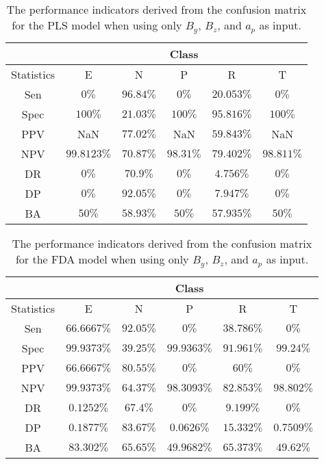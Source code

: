 \begin{table}[!ht]
	\centering
	\begin{tabular}{|c|c|c|c|c|c|}
		\hline
		 & \multicolumn{5}{c|}{Class} \\ \hline
		Statistics & E & N & P & R & T \\ \hline
		Sen & $0\%$ & $96.84\%$ & $0\%$ & $20.053\%$ & $0\%$ \\ \hline
		Spec & $100\%$ & $21.03\%$ & $100\%$ & $95.816\%$ & $100\%$ \\ \hline
		PPV & NaN & $77.02\%$ & NaN & $59.843\%$ & NaN \\ \hline
		NPV & $99.8123\%$ & $70.87\%$ & $98.31\%$ & $79.402\%$ & $98.811\%$ \\ \hline
		DR & $0\%$ & $70.9\%$ & $0\%$ & $4.756\%$ & $0\%$ \\ \hline
		DP & $0\%$ & $92.05\%$ & $0\%$ & $7.947\%$ & $0\%$ \\ \hline
		BA & $50\%$ & $58.93\%$ & $50\%$ & $57.935\%$ & $50\%$ \\ \hline
	\end{tabular}
	\caption{The performance indicators derived from the confusion matrix for the PLS model when using only $B_{y}$, $B_{z}$, and $a_{p}$ as input.}
	\label{tab:cs:reverse:yzap:pls}
\end{table}

\begin{table}[!ht]
	\centering
	\begin{tabular}{|c|c|c|c|c|c|}
		\hline
		 & \multicolumn{5}{c|}{Class} \\ \hline
		Statistics & E & N & P & R & T \\ \hline
		Sen & $66.6667\%$ & $92.05\%$ & $0\%$ & $38.786\%$ & $0\%$ \\ \hline
		Spec & $99.9373\%$ & $39.25\%$ & $99.9363\%$ & $91.961\%$ & $99.24\%$ \\ \hline
		PPV & $66.6667\%$ & $80.55\%$ & $0\%$ & $60\%$ & $0\%$ \\ \hline
		NPV & $99.9373\%$ & $64.37\%$ & $98.3093\%$ & $82.853\%$ & $98.802\%$ \\ \hline
		DR & $0.1252\%$ & $67.4\%$ & $0\%$ & $9.199\%$ & $0\%$ \\ \hline
		DP & $0.1877\%$ & $83.67\%$ & $0.0626\%$ & $15.332\%$ & $0.7509\%$ \\ \hline
		BA & $83.302\%$ & $65.65\%$ & $49.9682\%$ & $65.373\%$ & $49.62\%$ \\ \hline
	\end{tabular}
	\caption{The performance indicators derived from the confusion matrix for the FDA model when using only $B_{y}$, $B_{z}$, and $a_{p}$ as input.}
	\label{tab:cs:reverse:yzap:fda}
\end{table}

